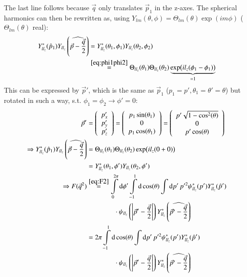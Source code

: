 \documentclass{scrartcl}
\begin{document}
The last line follows because $\vec{q}$ only translates $\vec{p}_1$ in the z-axes.
The spherical harmonics can then be rewritten as, using $Y_{lm}(\theta,\phi)=\Theta_{lm}(\theta)\exp(i m \phi)$ ($\Theta_{lm}(\theta)$ real):
\begin{align}
	Y_{ll_z}^*(\hat{p}_1)Y_{ll_z}\left(\widehat{\vec{p}-\frac{\vec{q}}{2}}\right)&=Y_{ll_z}^*(\theta_1,\phi_1)Y_{ll_z}(\theta_2,\phi_2)\\
	&\overset{\ref{eq:phi1phi2}}{=}\Theta_{ll_z}(\theta_1)\Theta_{ll_z}(\theta_2)\underbrace{\exp(i l_z (\phi_1-\phi_1))}_{\substack{=1}}
\end{align}
This can be expressed by $\vec{p}'$, which is the same  as $\vec{p}_1$ ($p_1=p', \theta_1=\theta'=\theta$) but rotated in such a way, s.t. $\phi_1=\phi_2\rightarrow \phi'=0$:
\begin{align}
	\vec{p}'&=\left(\begin{array}{c}
	p_{x}'\\
	p_{y}'\\
	p_{z}'
	\end{array}\right)=\left(\begin{array}{c}
	p_{1}\sin(\theta_1)\\
	0\\
	p_{1}\cos(\theta_1)
	\end{array}\right)=\left(\begin{array}{c}
	p'\sqrt{1-\cos[2](\theta)}\\
	0\\
	p'\cos(\theta)
	\end{array}\right)\\
	\Rightarrow Y_{ll_z}^*(\hat{p}_1)Y_{ll_z}\left(\widehat{\vec{p}-\frac{\vec{q}}{2}}\right)&=\Theta_{ll_z}(\theta_1)\Theta_{ll_z}(\theta_2) \exp(i l_z(0+0))\\
	&=Y_{ll_z}^*(\theta_1,\phi')Y_{ll_z}(\theta_2,\phi')\\
	\Rightarrow	F(\vec{q}^2)&\overset{\ref{eq:F2}}{=} \int\limits_0^{2\pi} \dd{\phi'}\int\limits_{-1}^{1} \dd{\cos(\theta)}\int\dd{p'} p'^2\psi_{ll_z}^*(p') Y_{ll_z}^*(\hat{p}')\\
	&\qquad\qquad\cdot\psi_{ll_z}\left(\abs{\vec{p}'-\frac{\vec{q}}{2}}\right) Y_{ll_z}^*\left(\widehat{\vec{p}'-\frac{\vec{q}}{2}}\right)\\
	&=2\pi\int\limits_{-1}^{1} \dd{\cos(\theta)}\int\dd{p'} p'^2\psi_{ll_z}^*(p') Y_{ll_z}^*(\hat{p}')\\
	&\qquad\qquad\cdot\psi_{ll_z}\left(\abs{\vec{p}'-\frac{\vec{q}}{2}}\right) Y_{ll_z}^*\left(\widehat{\vec{p}'-\frac{\vec{q}}{2}}\right)
\end{align}
\end{document}
